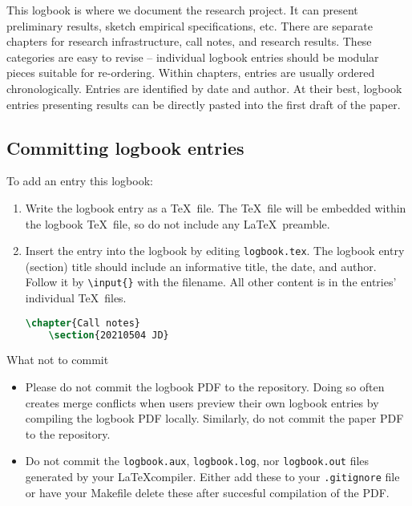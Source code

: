 
This logbook is where we document the research project.
It can present preliminary results, sketch empirical specifications, etc.
There are separate chapters for research infrastructure, call notes, and research results.
These categories are easy to revise -- individual logbook entries should be modular pieces suitable for re-ordering.
Within chapters, entries are usually ordered chronologically. Entries are identified by date and author.
At their best, logbook entries presenting results can be directly pasted into the first draft of the paper.

\subsection{Committing logbook entries}

To add an entry this logbook:
\begin{enumerate}
	\item Write the logbook entry as a \TeX\ file. The \TeX\ file will be embedded within the logbook \TeX\ file, so do not include any \LaTeX\ preamble.
	\item Insert the entry into the logbook by editing \texttt{logbook.tex}.
	The logbook entry (section) title should include an informative title, the date, and author.
	Follow it by \texttt{\textbackslash input\{\}} with the filename.
	All other content is in the entries' individual \TeX\ files.
	\begin{lstlisting}[language=tex]
	\chapter{Call notes}
	\section{20210504 JD} 
	\end{lstlisting}
\end{enumerate}

What not to commit
\begin{itemize}
	\item Please do not commit the logbook PDF to the repository.
	Doing so often creates merge conflicts when users preview their own logbook entries by compiling the logbook PDF locally.
	Similarly, do not commit the paper PDF to the repository.
	\item Do not commit the \texttt{logbook.aux}, \texttt{logbook.log}, nor \texttt{logbook.out} files generated by your \LaTeX compiler.
	Either add these to your \texttt{.gitignore} file or have your Makefile delete these after succesful compilation of the PDF.
\end{itemize}
